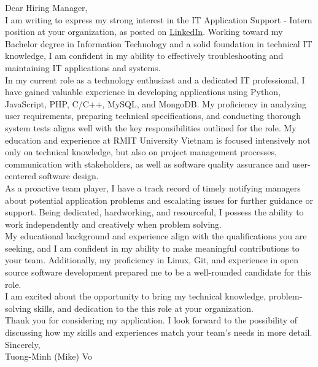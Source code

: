 \documentclass[a4paper,11pt]{article}
\newcommand{\p}[1]{#1\\\vspace{6pt}}
\begin{document}
\p{Dear Hiring Manager,}
\p{I am writing to express my strong interest in the IT Application Support - Intern position at your organization, as posted on \href{https://www.linkedin.com/jobs/view/it-application-support-intern-at-chubb-3804522468/}{LinkedIn}. Working toward my Bachelor degree in Information Technology and a solid foundation in technical IT knowledge, I am confident in my ability to effectively troubleshooting and maintaining IT applications and systems.}
\p{In my current role as a technology enthusiast and a dedicated IT professional, I have gained valuable experience in developing applications using Python, JavaScript, PHP, C/C++, MySQL, and MongoDB. My proficiency in analyzing user requirements, preparing technical specifications, and conducting thorough system tests aligns well with the key responsibilities outlined for the role. My education and experience at RMIT University Vietnam is focused intensively not only on technical knowledge, but also on project management processes, communication with stakeholders, as well as software quality assurance and user-centered software design.}
\p{As a proactive team player, I have a track record of timely notifying managers about potential application problems and escalating issues for further guidance or support. Being dedicated, hardworking, and resourceful, I possess the ability to work independently and creatively when problem solving.}
\p{My educational background and experience align with the qualifications you are seeking, and I am confident in my ability to make meaningful contributions to your team. Additionally, my proficiency in Linux, Git, and experience in open source software development prepared me to be a well-rounded candidate for this role.}
\p{I am excited about the opportunity to bring my technical knowledge, problem-solving skills, and dedication to the this role at your organization.}
\p{Thank you for considering my application. I look forward to the possibility of discussing how my skills and experiences match your team's needs in more detail.}
\p{Sincerely,\\
Tuong-Minh (Mike) Vo}
\end{document}
